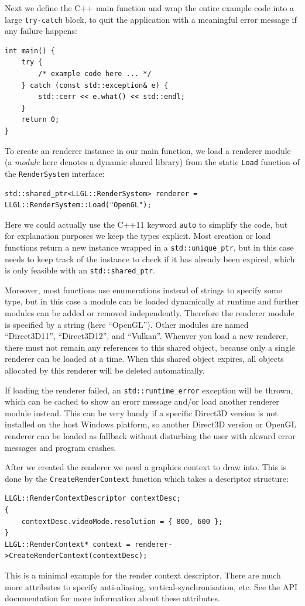 \documentclass{article}
\begin{document}
Next we define the C++ main function and wrap the entire example code into a large \texttt{try-catch} block,
to quit the application with a meaningful error message if any failure happens:
\begin{lstlisting}
int main() {
    try {
        /* example code here ... */
    } catch (const std::exception& e) {
        std::cerr << e.what() << std::endl;
    }
    return 0;
}
\end{lstlisting}

To create an \LLGL renderer instance in our main function, we load a renderer module
(a \textit{module} here denotes a dynamic shared library)
from the static \texttt{Load} function of the \texttt{RenderSystem} interface:
\begin{lstlisting}
std::shared_ptr<LLGL::RenderSystem> renderer = LLGL::RenderSystem::Load("OpenGL");
\end{lstlisting}
Here we could actually use the C++11 keyword \texttt{auto} to simplify the code,
but for explanation purposes we keep the types explicit.
Most creation or load functions return a new instance wrapped in a \texttt{std::unique\_ptr},
but in this case \LLGL needs to keep track of the instance to check if it has already been expired,
which is only feasible with an \texttt{std::shared\_ptr}.

Moreover, most functions use enumerations instead of strings to specify some type, but in this case
a module can be loaded dynamically at runtime and further modules can be added or removed independently.
Therefore the renderer module is specified by a string (here ``OpenGL''). Other modules are
named ``Direct3D11'', ``Direct3D12'', and ``Vulkan''.
Whenver you load a new renderer, there must not remain any references to this shared object,
because only a single renderer can be loaded at a time.
When this shared object expires, all objects allocated by this renderer will be deleted automatically.

If loading the renderer failed, an \texttt{std::runtime\_error} exception will be thrown,
which can be cached to show an erorr message and/or load another renderer module instead.
This can be very handy if a specific Direct3D version is not installed on the host Windows platform,
so another Direct3D version or OpenGL renderer can be loaded as fallback
without disturbing the user with akward error messages and program crashes.

After we created the renderer we need a graphics context to draw into.
This is done by the \texttt{CreateRenderContext} function which takes a descriptor structure:
\begin{lstlisting}
LLGL::RenderContextDescriptor contextDesc;
{
    contextDesc.videoMode.resolution = { 800, 600 };
}
LLGL::RenderContext* context = renderer->CreateRenderContext(contextDesc);
\end{lstlisting}
This is a minimal example for the render context descriptor. There are much more attributes
to specify anti-aliasing, vertical-synchronisation, etc.
See the API documentation for more information about these attributes.
\end{document}
